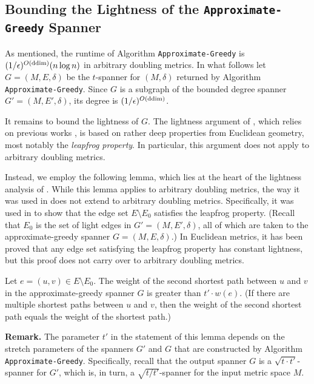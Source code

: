 \documentclass[11pt,letterpaper]{article}
\newcommand{\ddim}{{\rm ddim}}
\newcommand{\eps}{\epsilon}
\begin{document}
\subsection{Bounding the Lightness of the  \texttt{Approximate-Greedy} Spanner} \label{bounding}
As mentioned, the runtime of Algorithm \texttt{Approximate-Greedy} is $(1/\eps)^{O(\ddim)}(n \log n)$  in arbitrary doubling metrics.
In what follows let $G = (M,E,\delta)$ be the $t$-spanner for $(M,\delta)$  returned by Algorithm \texttt{Approximate-Greedy}.
Since $G$ is a subgraph of the bounded degree spanner $G' = (M,E',\delta)$, its degree is $(1/\eps)^{O(\ddim)}$.

It remains to bound the lightness of $G$.
The lightness argument of \cite{GLN02}, which relies on previous works \cite{DHN93,DN97},
is based on rather deep properties from Euclidean geometry, most notably the \emph{leapfrog property}.
In particular, this argument does not apply to arbitrary doubling metrics.

Instead, we employ the following lemma, which lies at the heart of the lightness analysis of \cite{GLN02}.
While this lemma applies to arbitrary doubling metrics, the way it was used in \cite{GLN02} does not extend to arbitrary doubling metrics.
Specifically, it was used in \cite{GLN02} to show that the edge set $E \setminus E_0$ satisfies the leapfrog property.
(Recall that $E_0$ is the set of light edges in $G' = (M,E',\delta)$, all of which are taken to the approximate-greedy spanner $G = (M,E,\delta)$.)
In Euclidean metrics, it has been proved \cite{DHN93,NS07} that any edge set satisfying the leapfrog property has constant lightness, but this proof does not carry over to arbitrary doubling metrics.
\begin{lemma}\label{lem:GLN_second_path}
	Let $e=(u,v) \in E \setminus E_0$. The weight of the second shortest path between $u$ and $v$ in the approximate-greedy spanner $G$ is greater than $t' \cdot w(e)$.
	(If there are multiple shortest paths between $u$ and $v$, then the weight of the second shortest path equals the weight of the shortest path.)
\end{lemma}
\noindent
{\bf Remark.} The parameter $t'$ in the statement of this lemma depends on the stretch parameters of the spanners $G'$ and $G$
that are constructed by Algorithm \texttt{Approximate-Greedy}.
Specifically, recall that the output spanner $G$ is a $\sqrt{t \cdot t'}$-spanner for $G'$,
which is, in turn, a $\sqrt{t/t'}$-spanner for the input metric space $M$.
\end{document}
